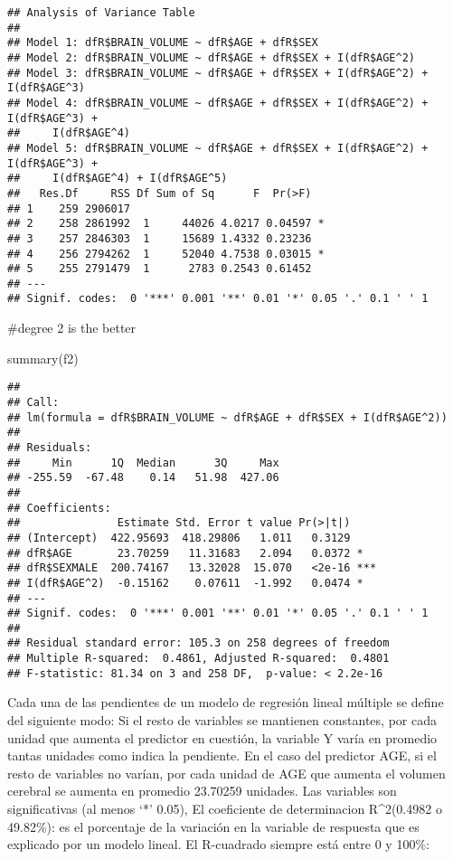\documentclass[
]{article}
\newenvironment{Shaded}{\begin{snugshade}}{\end{snugshade}}
\newcommand{\FunctionTok}[1]{\textcolor[rgb]{0.00,0.00,0.00}{#1}}
\newcommand{\NormalTok}[1]{#1}
\begin{document}
\begin{verbatim}
## Analysis of Variance Table
## 
## Model 1: dfR$BRAIN_VOLUME ~ dfR$AGE + dfR$SEX
## Model 2: dfR$BRAIN_VOLUME ~ dfR$AGE + dfR$SEX + I(dfR$AGE^2)
## Model 3: dfR$BRAIN_VOLUME ~ dfR$AGE + dfR$SEX + I(dfR$AGE^2) + I(dfR$AGE^3)
## Model 4: dfR$BRAIN_VOLUME ~ dfR$AGE + dfR$SEX + I(dfR$AGE^2) + I(dfR$AGE^3) + 
##     I(dfR$AGE^4)
## Model 5: dfR$BRAIN_VOLUME ~ dfR$AGE + dfR$SEX + I(dfR$AGE^2) + I(dfR$AGE^3) + 
##     I(dfR$AGE^4) + I(dfR$AGE^5)
##   Res.Df     RSS Df Sum of Sq      F  Pr(>F)  
## 1    259 2906017                              
## 2    258 2861992  1     44026 4.0217 0.04597 *
## 3    257 2846303  1     15689 1.4332 0.23236  
## 4    256 2794262  1     52040 4.7538 0.03015 *
## 5    255 2791479  1      2783 0.2543 0.61452  
## ---
## Signif. codes:  0 '***' 0.001 '**' 0.01 '*' 0.05 '.' 0.1 ' ' 1
\end{verbatim}

\#degree 2 is the better

\begin{Shaded}
\begin{Highlighting}[]
\FunctionTok{summary}\NormalTok{(f2) }
\end{Highlighting}
\end{Shaded}

\begin{verbatim}
## 
## Call:
## lm(formula = dfR$BRAIN_VOLUME ~ dfR$AGE + dfR$SEX + I(dfR$AGE^2))
## 
## Residuals:
##     Min      1Q  Median      3Q     Max 
## -255.59  -67.48    0.14   51.98  427.06 
## 
## Coefficients:
##               Estimate Std. Error t value Pr(>|t|)    
## (Intercept)  422.95693  418.29806   1.011   0.3129    
## dfR$AGE       23.70259   11.31683   2.094   0.0372 *  
## dfR$SEXMALE  200.74167   13.32028  15.070   <2e-16 ***
## I(dfR$AGE^2)  -0.15162    0.07611  -1.992   0.0474 *  
## ---
## Signif. codes:  0 '***' 0.001 '**' 0.01 '*' 0.05 '.' 0.1 ' ' 1
## 
## Residual standard error: 105.3 on 258 degrees of freedom
## Multiple R-squared:  0.4861, Adjusted R-squared:  0.4801 
## F-statistic: 81.34 on 3 and 258 DF,  p-value: < 2.2e-16
\end{verbatim}

Cada una de las pendientes de un modelo de regresión lineal múltiple se
define del siguiente modo: Si el resto de variables se mantienen
constantes, por cada unidad que aumenta el predictor en cuestión, la
variable Y varía en promedio tantas unidades como indica la pendiente.
En el caso del predictor AGE, si el resto de variables no varían, por
cada unidad de AGE que aumenta el volumen cerebral se aumenta en
promedio 23.70259 unidades. Las variables son significativas (al menos
`*' 0.05), El coeficiente de determinacion R\^{}2(0.4982 o 49.82\%): es
el porcentaje de la variación en la variable de respuesta que es
explicado por un modelo lineal. El R-cuadrado siempre está entre 0 y
100\%:
\end{document}
